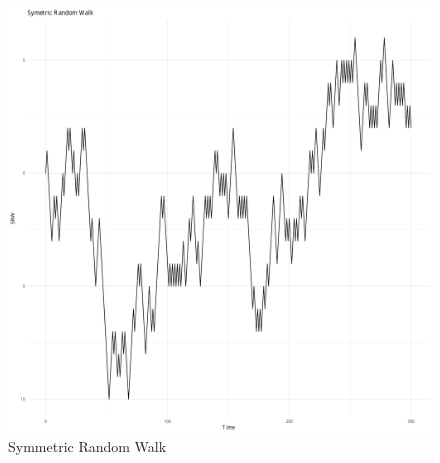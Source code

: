 \documentclass{article}
\begin{document}
\begin{figure}[!h]
\begin{center}

\includegraphics{SymmetricRandomWalk-003}


\end{center}
\caption{Symmetric Random Walk}
\end{figure}
\end{document}
